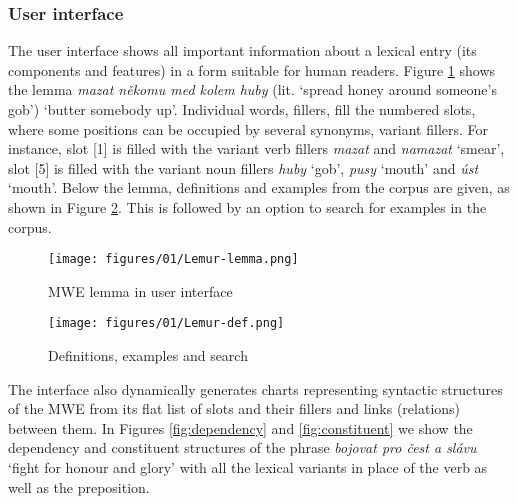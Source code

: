 \documentclass[output=paper,colorlinks,citecolor=brown]{langscibook}
\begin{document}
\subsubsection{User interface}
\label{sec:user-interface}

The user interface shows all important information about a lexical entry (its components and features) in a form suitable for human readers. Figure \ref{fig:lemma} shows the lemma \textit{mazat někomu med kolem huby} (lit. `spread honey around someone's gob') `butter somebody up'. Individual words, fillers, fill the numbered slots, where some positions can be occupied by several synonyms, variant fillers. For instance, slot [1] is filled with the variant verb fillers \textit{mazat} and \textit{namazat} `smear', slot [5] is filled with the variant noun fillers \textit{huby} `gob', \textit{pusy} `mouth' and \textit{úst} `mouth'. Below the lemma, definitions and examples from the corpus are given, as shown in Figure \ref{fig:def}. This is followed by an option to search for examples in the corpus.

\begin{figure}
    \texttt{[image: figures/01/Lemur-lemma.png]}
    \caption{MWE lemma in user interface}
    \label{fig:lemma}
\end{figure}

\begin{figure}
    \centering
    \texttt{[image: figures/01/Lemur-def.png]}
    \caption{Definitions, examples and search}
    \label{fig:def}
\end{figure}

The interface also dynamically generates charts representing syntactic structures of the MWE from its flat list of slots and their fillers and links (relations) between them. In Figures \ref{fig:dependency} and \ref{fig:constituent} we show the dependency and constituent structures of the phrase \textit{bojovat pro čest a slávu} `fight for honour and glory' with all the lexical variants in place of the verb as well as the preposition.
\end{document}
